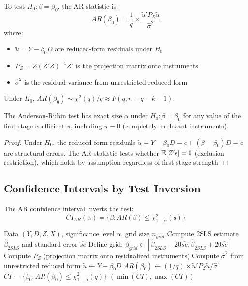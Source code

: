 \begin{definition}
\label{def:ar_test}
To test $H_0: \beta = \beta_0$, the AR statistic is:
\[
AR(\beta_0) = \frac{1}{q} \times \frac{\tilde{u}' P_Z \tilde{u}}{\hat{\sigma}^2}
\]
where:
\begin{itemize}
    \item $\tilde{u} = Y - \beta_0 D$ are reduced-form residuals under $H_0$
    \item $P_Z = Z(Z'Z)^{-1}Z'$ is the projection matrix onto instruments
    \item $\hat{\sigma}^2$ is the residual variance from unrestricted reduced form
\end{itemize}
Under $H_0$, $AR(\beta_0) \sim \chi^2(q)/q \approx F(q, n-q-k-1)$.
\end{definition}

\begin{theorem}
\label{thm:ar_validity}
The Anderson-Rubin test has exact size $\alpha$ under $H_0: \beta = \beta_0$ for any value of the first-stage coefficient $\pi$, including $\pi = 0$ (completely irrelevant instruments).
\end{theorem}

\begin{proof}
Under $H_0$, the reduced-form residuals $\tilde{u} = Y - \beta_0 D = \epsilon + (\beta - \beta_0)D = \epsilon$ are structural errors. The AR statistic tests whether $\mathbb{E}[Z'\epsilon] = 0$ (exclusion restriction), which holds by assumption regardless of first-stage strength.
\end{proof}

\subsection{Confidence Intervals by Test Inversion}

The AR confidence interval inverts the test:
\[
CI_{AR}(\alpha) = \{\beta : AR(\beta) \leq \chi^2_{1-\alpha}(q)\}
\]

\begin{algorithm}[htbp]
\caption{Anderson-Rubin Confidence Interval}
\label{alg:ar_ci}
\begin{algorithmic}[1]
\REQUIRE Data $(Y, D, Z, X)$, significance level $\alpha$, grid size $n_{grid}$
\STATE Compute 2SLS estimate $\hat{\beta}_{2SLS}$ and standard error $\hat{se}$
\STATE Define grid: $\beta_{grid} \in [\hat{\beta}_{2SLS} - 20\hat{se}, \hat{\beta}_{2SLS} + 20\hat{se}]$
\STATE Compute $P_Z$ (projection matrix onto residualized instruments)
\STATE Compute $\hat{\sigma}^2$ from unrestricted reduced form
    \STATE $\tilde{u} \gets Y - \beta_0 D$
    \STATE $AR(\beta_0) \gets (1/q) \times \tilde{u}' P_Z \tilde{u} / \hat{\sigma}^2$
\ENDFOR
\STATE $CI \gets \{\beta_0 : AR(\beta_0) \leq \chi^2_{1-\alpha}(q)\}$
\RETURN $(\min(CI), \max(CI))$
\end{algorithmic}
\end{algorithm}

